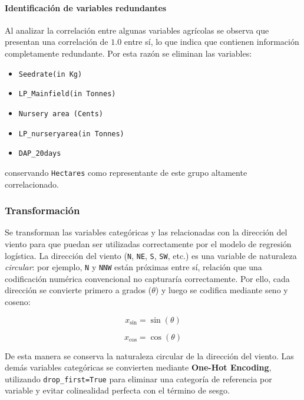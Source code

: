 \documentclass[journal]{IEEEtran}
\begin{document}
\paragraph{Identificación de variables redundantes}
Al analizar la correlación entre algunas variables agrícolas se observa que presentan una correlación de $1.0$ entre sí, lo que indica que contienen información completamente redundante. Por esta razón se eliminan las variables:
\begin{itemize}
    \item \texttt{Seedrate(in Kg)}
    \item \texttt{LP\_Mainfield(in Tonnes)}
    \item \texttt{Nursery area (Cents)}
    \item \texttt{LP\_nurseryarea(in Tonnes)}
    \item \texttt{DAP\_20days}
\end{itemize}
conservando \texttt{Hectares} como representante de este grupo altamente correlacionado.

\subsubsection{Transformación}
Se transforman las variables categóricas y las relacionadas con la dirección del viento para que puedan ser utilizadas correctamente por el modelo de regresión logística. La dirección del viento (\texttt{N}, \texttt{NE}, \texttt{S}, \texttt{SW}, etc.) es una variable de naturaleza \emph{circular}: por ejemplo, \texttt{N} y \texttt{NNW} están próximas entre sí, relación que una codificación numérica convencional no capturaría correctamente. Por ello, cada dirección se convierte primero a grados ($\theta$) y luego se codifica mediante seno y coseno:

\begin{equation}
x_{\sin} = \sin(\theta)
\label{eq:wind_sin}
\end{equation}

\begin{equation}
x_{\cos} = \cos(\theta)
\label{eq:wind_cos}
\end{equation}

De esta manera se conserva la naturaleza circular de la dirección del viento. Las demás variables categóricas se convierten mediante \textbf{One-Hot Encoding}, utilizando \texttt{drop\_first=True} para eliminar una categoría de referencia por variable y evitar colinealidad perfecta con el término de sesgo.
\end{document}
